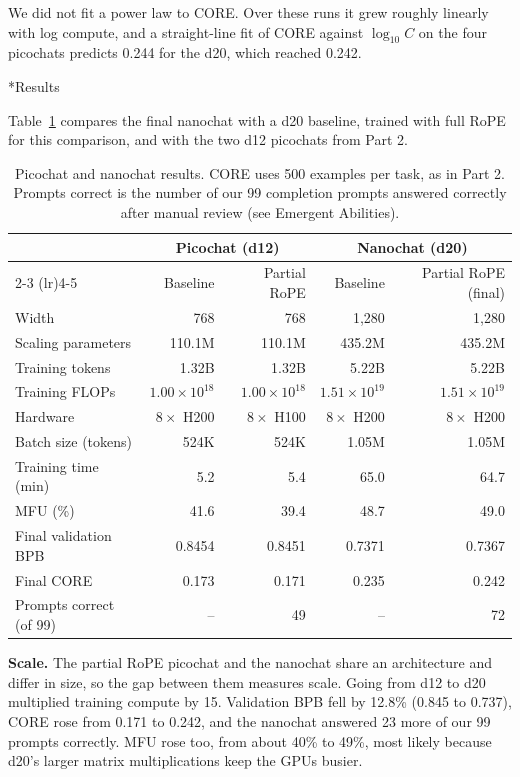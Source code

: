 \documentclass[11pt]{article}
\makeatletter
\renewcommand\subsection{\@startsection{subsection}{2}{\z@}{0.6em}{0.2em}{\normalsize\bfseries}}
\makeatother
\begin{document}
We did not fit a power law to CORE. Over these runs it grew roughly linearly with log compute, and a straight-line fit of CORE against $\log_{10} C$ on the four picochats predicts 0.244 for the d20, which reached 0.242.

\subsection*{Results}

Table~\ref{tab:part5-results} compares the final nanochat with a d20 baseline, trained with full RoPE for this comparison, and with the two d12 picochats from Part 2.

\begin{table}[H]
\centering
\caption{Picochat and nanochat results. CORE uses 500 examples per task, as in Part 2. Prompts correct is the number of our 99 completion prompts answered correctly after manual review (see Emergent Abilities).}
\label{tab:part5-results}
\small
\begin{tabular}{@{}lrrrr@{}}
\toprule
 & \multicolumn{2}{c}{Picochat (d12)} & \multicolumn{2}{c}{Nanochat (d20)} \\
\cmidrule(lr){2-3} \cmidrule(lr){4-5}
 & Baseline & Partial RoPE & Baseline & Partial RoPE (final) \\
\midrule
Width & 768 & 768 & 1,280 & 1,280 \\
Scaling parameters & 110.1M & 110.1M & 435.2M & 435.2M \\
Training tokens & 1.32B & 1.32B & 5.22B & 5.22B \\
Training FLOPs & $1.00 \times 10^{18}$ & $1.00 \times 10^{18}$ & $1.51 \times 10^{19}$ & $1.51 \times 10^{19}$ \\
Hardware & $8 \times$ H200 & $8 \times$ H100 & $8 \times$ H200 & $8 \times$ H200 \\
Batch size (tokens) & 524K & 524K & 1.05M & 1.05M \\
Training time (min) & 5.2 & 5.4 & 65.0 & 64.7 \\
MFU (\%) & 41.6 & 39.4 & 48.7 & 49.0 \\
Final validation BPB & 0.8454 & 0.8451 & 0.7371 & 0.7367 \\
Final CORE & 0.173 & 0.171 & 0.235 & 0.242 \\
Prompts correct (of 99) & -- & 49 & -- & 72 \\
\bottomrule
\end{tabular}
\end{table}

\textbf{Scale.} The partial RoPE picochat and the nanochat share an architecture and differ in size, so the gap between them measures scale. Going from d12 to d20 multiplied training compute by 15. Validation BPB fell by 12.8\% (0.845 to 0.737), CORE rose from 0.171 to 0.242, and the nanochat answered 23 more of our 99 prompts correctly. MFU rose too, from about 40\% to 49\%, most likely because d20's larger matrix multiplications keep the GPUs busier.
\end{document}
